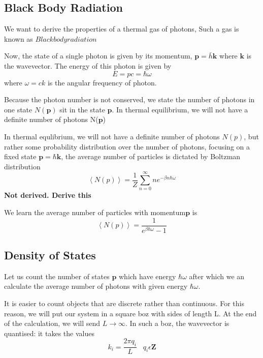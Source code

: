 \documentclass[12pt]{report}
\newcommand{\mbf}[1]{\mathbf{#1}}
\newcommand{\tbf}[1]{\textbf{#1}}
\begin{document}
\subsection{Black Body Radiation}
We want to derive the properties of a thermal gas of photons, Such a gas is known as $Blackbody radiation$

Now, the state of a single photon is given by its momentum, $\mbf{p}= \bar{h}\mbf{k}$ where $\mbf{k}$ is the wavevector. The energy of this photon is given by
\begin{equation}
E=pc=\hbar\omega
\end{equation} 
where $\omega = ck$ is the angular frequency of photon. 

Because the photon number is not conserved, we state the number of photons in one state $N(\mbf{p})$ sit in the state $\mbf{p}.$ In thermal equilibrium, we will not have a definite number of photons N($\mbf{p}$)

In thermal equlibrium, we will not have a definite number of photons $N(p)$, but rather some probability distribution over the number of photons, focusing on a fixed state $\mbf{p}=\hbar \mbf{k}$, the average number of particles is dictated by Boltzman distribution
\begin{equation}
\left\langle N(p)\right\rangle=\frac{1}{Z}\sum^\infty_{n=0} n e^{-\beta n \hbar \omega}
\end{equation}
\tbf{Not derived. Derive this}

We learn the average number of particles with momentum$\mbf{p}$ is 
\begin{equation} \label{Averagenoeq}
\left\langle N(p)\right\rangle = \frac{1}{e^{\beta \hbar \omega} - 1}
\end{equation}

\subsection*{Density of States}
Let us count the number of states $\mbf{p}$ which have energy $\hbar \omega$ after which we an calculate the average number of photons with given energy $\hbar \omega$.

It is easier to count objects that are discrete rather than continuous.  For this reason, we will put our system in a square boz with sides of length L. At the end of the calculation, we will send $L \rightarrow \infty$. In such a boz, the wavevector is quantised: it takes the values 
\begin{equation}
k_i=\frac{2 \pi q_i}{L} \;\;\; q_i \epsilon \mbf{Z}
\end{equation}
\end{document}
